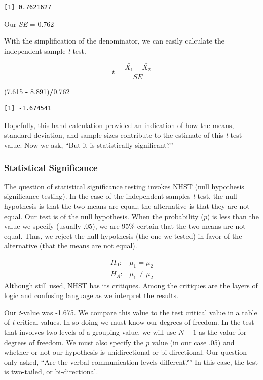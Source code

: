 \documentclass[
  11pt,
]{book}
\newenvironment{Shaded}{\begin{snugshade}}{\end{snugshade}}
\newcommand{\FloatTok}[1]{\textcolor[rgb]{0.06,0.06,0.06}{#1}}
\newcommand{\NormalTok}[1]{#1}
\newcommand{\SpecialCharTok}[1]{\textcolor[rgb]{0.43,0.43,0.43}{\textbf{#1}}}
\begin{document}
\begin{verbatim}
[1] 0.7621627
\end{verbatim}

Our \emph{SE} = 0.762

With the simplification of the denominator, we can easily calculate the independent sample \emph{t}-test.

\[t = \frac{\bar{X_{1}} -\bar{X_{2}}}{SE}\]

\begin{Shaded}
\begin{Highlighting}[]
\NormalTok{(}\FloatTok{7.615} \SpecialCharTok{{-}} \FloatTok{8.891}\NormalTok{)}\SpecialCharTok{/}\FloatTok{0.762}
\end{Highlighting}
\end{Shaded}

\begin{verbatim}
[1] -1.674541
\end{verbatim}

Hopefully, this hand-calculation provided an indication of how the means, standard deviation, and sample sizes contribute to the estimate of this \emph{t}-test value. Now we ask, ``But it is statistically significant?''

\hypertarget{statistical-significance-1}{%
\subsubsection{Statistical Significance}\label{statistical-significance-1}}

The question of statistical significance testing invokes NHST (null hypothesis significance testing). In the case of the independent samples \emph{t}-test, the null hypothesis is that the two means are equal; the alternative is that they are not equal. Our test is of the null hypothesis. When the probability (\emph{p}) is less than the value we specify (usually .05), we are 95\% certain that the two means are not equal. Thus, we reject the null hypothesis (the one we tested) in favor of the alternative (that the means are not equal).

\[
\begin{array}{ll}
H_0: & \mu_1 = \mu_2  \\
H_A: & \mu_1 \neq \mu_2
\end{array}
\] Although still used, NHST has its critiques. Among the critiques are the layers of logic and confusing language as we interpret the results.

Our \emph{t}-value was -1.675. We compare this value to the test critical value in a table of \emph{t} critical values. In-so-doing we must know our degrees of freedom. In the test that involves two levels of a grouping value, we will use \(N -1\) as the value for degrees of freedom. We must also specify the \emph{p} value (in our case .05) and whether-or-not our hypothesis is unidirectional or bi-directional. Our question only asked, ``Are the verbal communication levels different?'' In this case, the test is two-tailed, or bi-directional.
\end{document}
